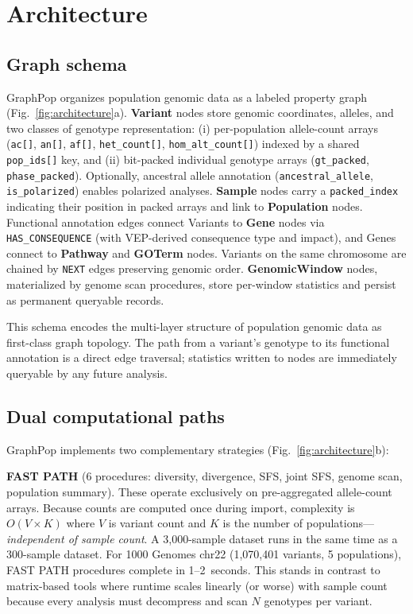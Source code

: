 \section*{Architecture}

\subsection*{Graph schema}

GraphPop organizes population genomic data as a labeled property graph (Fig.~\ref{fig:architecture}a). \textbf{Variant} nodes store genomic coordinates, alleles, and two classes of genotype representation: (i) per-population allele-count arrays (\texttt{ac[]}, \texttt{an[]}, \texttt{af[]}, \texttt{het\_count[]}, \texttt{hom\_alt\_count[]}) indexed by a shared \texttt{pop\_ids[]} key, and (ii) bit-packed individual genotype arrays (\texttt{gt\_packed}, \texttt{phase\_packed}). Optionally, ancestral allele annotation (\texttt{ancestral\_allele}, \texttt{is\_polarized}) enables polarized analyses. \textbf{Sample} nodes carry a \texttt{packed\_index} indicating their position in packed arrays and link to \textbf{Population} nodes. Functional annotation edges connect Variants to \textbf{Gene} nodes via \texttt{HAS\_CONSEQUENCE} (with VEP-derived consequence type and impact), and Genes connect to \textbf{Pathway} and \textbf{GOTerm} nodes. Variants on the same chromosome are chained by \texttt{NEXT} edges preserving genomic order. \textbf{GenomicWindow} nodes, materialized by genome scan procedures, store per-window statistics and persist as permanent queryable records.

This schema encodes the multi-layer structure of population genomic data as first-class graph topology. The path from a variant's genotype to its functional annotation is a direct edge traversal; statistics written to nodes are immediately queryable by any future analysis.

\subsection*{Dual computational paths}

GraphPop implements two complementary strategies (Fig.~\ref{fig:architecture}b):

\textbf{FAST PATH} (6 procedures: diversity, divergence, SFS, joint SFS, genome scan, population summary). These operate exclusively on pre-aggregated allele-count arrays. Because counts are computed once during import, complexity is $O(V \times K)$ where $V$ is variant count and $K$ is the number of populations---\emph{independent of sample count}. A 3{,}000-sample dataset runs in the same time as a 300-sample dataset. For 1000 Genomes chr22 (1{,}070{,}401 variants, 5 populations), FAST PATH procedures complete in 1--2~seconds. This stands in contrast to matrix-based tools where runtime scales linearly (or worse) with sample count because every analysis must decompress and scan $N$ genotypes per variant.

